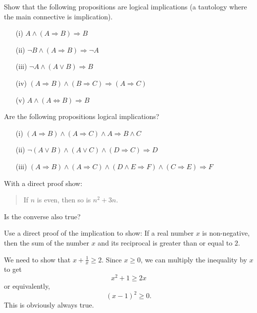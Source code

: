 \documentclass[11pt,paper=b5,footinclude,headinclude]{scrbook} %
\theoremstyle{remark}
\theoremstyle{definition} %
\theoremstyle{theorem} %
\newtheorem{ex}{Exercise\hypertarget{sol:\theex}}[chapter]
\begin{document}
\begin{ex} Show that the following propositions are logical implications (a tautology where the main connective is implication).
\begin{enumerate}
\item[(i)] $A \wedge (A \Rightarrow B) \Rightarrow B$
\item[(ii)] $\neg B \wedge (A \Rightarrow B) \Rightarrow \neg A$
\item[(iii)] $\neg A \wedge (A \vee B) \Rightarrow B$
\item[(iv)] $(A \Rightarrow B) \wedge (B \Rightarrow C) \Rightarrow (A \Rightarrow C)$
\item[(v)] $A \wedge (A \Leftrightarrow B) \Rightarrow B$
\end{enumerate}



\end{ex} \begin{ex} Are the following propositions logical implications?
\begin{enumerate}
\item[(i)] $(A \Rightarrow B ) \wedge (A \Rightarrow C) \wedge A \Rightarrow B \wedge C$
\item[(ii)] $\neg (A \vee B) \wedge (A\vee C) \wedge (D\Rightarrow C) \Rightarrow D$
\item[(iii)] $(A\Rightarrow B) \wedge (A\Rightarrow C) \wedge (D\wedge E \Rightarrow F) \wedge (C\Rightarrow E) \Rightarrow F$
\end{enumerate}

\end{ex} \begin{ex} With a direct proof show:
\begin{quote}
    If $n$ is even, then so is $n^2 +3n$.
\end{quote}
Is the converse also true?






    \end{ex} \begin{ex} Use a direct proof of the implication to show: If a real number $x$ is non-negative, then the sum of the number $x$ and its reciprocal is greater than or equal to $2$.
\begin{sol}
    We need to show that $x + \frac{1}{x} \geq 2$. Since $x \geq 0$, we can multiply the inequality by $x$ to get
    \[
    x^2 + 1 \geq 2x
    \]
    or equivalently,
    \[
    (x - 1)^2 \geq 0.
    \]
    This is obviously always true.
\end{sol}


\end{ex}
\end{document}
